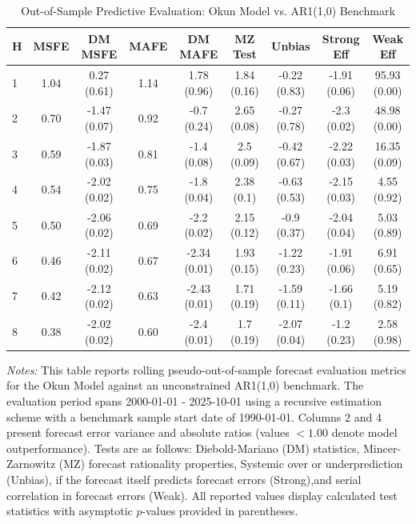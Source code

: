 \begin{table}[htbp]
\centering
\caption{Out-of-Sample Predictive Evaluation: Okun Model vs. AR1(1,0) Benchmark}
\label{tab:okun_model_evaluation}
\footnotesize
\begin{tabular}{l cccccccc}
\hline\hline
\rule{0pt}{3ex}
\textbf{H} & \textbf{MSFE} & \textbf{DM MSFE} & \textbf{MAFE} & \textbf{DM MAFE} & \textbf{MZ Test} & \textbf{Unbias} & \textbf{Strong Eff} & \textbf{Weak Eff} \\[0.5ex]
\hline
\rule{0pt}{2.5ex}
1 & 1.04 & 0.27 (0.61) & 1.14 & 1.78 (0.96) & 1.84 (0.16) & -0.22 (0.83) & -1.91 (0.06) & 95.93 (0.00) \\
2 & 0.70 & -1.47 (0.07) & 0.92 & -0.7 (0.24) & 2.65 (0.08) & -0.27 (0.78) & -2.3 (0.02) & 48.98 (0.00) \\
3 & 0.59 & -1.87 (0.03) & 0.81 & -1.4 (0.08) & 2.5 (0.09) & -0.42 (0.67) & -2.22 (0.03) & 16.35 (0.09) \\
4 & 0.54 & -2.02 (0.02) & 0.75 & -1.8 (0.04) & 2.38 (0.1) & -0.63 (0.53) & -2.15 (0.03) & 4.55 (0.92) \\
5 & 0.50 & -2.06 (0.02) & 0.69 & -2.2 (0.02) & 2.15 (0.12) & -0.9 (0.37) & -2.04 (0.04) & 5.03 (0.89) \\
6 & 0.46 & -2.11 (0.02) & 0.67 & -2.34 (0.01) & 1.93 (0.15) & -1.22 (0.23) & -1.91 (0.06) & 6.91 (0.65) \\
7 & 0.42 & -2.12 (0.02) & 0.63 & -2.43 (0.01) & 1.71 (0.19) & -1.59 (0.11) & -1.66 (0.1) & 5.19 (0.82) \\
8 & 0.38 & -2.02 (0.02) & 0.60 & -2.4 (0.01) & 1.7 (0.19) & -2.07 (0.04) & -1.2 (0.23) & 2.58 (0.98) \\
\hline\hline
\end{tabular}%
\par\smallskip
\parbox{\textwidth}{\scriptsize \textit{Notes:} This table reports rolling pseudo-out-of-sample forecast evaluation metrics for the Okun Model against an unconstrained AR1(1,0) benchmark. The evaluation period spans 2000-01-01 - 2025-10-01 using a recursive estimation scheme with a benchmark sample start date of 1990-01-01. Columns 2 and 4 present forecast error variance and absolute ratios (values $< 1.00$ denote model outperformance). Tests are as follows: Diebold-Mariano (DM) statistics, Mincer-Zarnowitz (MZ) forecast rationality properties, Systemic over or underprediction (Unbias), if the forecast itself predicts forecast errors (Strong),and serial correlation in forecast errors (Weak). All reported values display calculated test statistics with asymptotic $p$-values provided in parentheses.}
\end{table}
